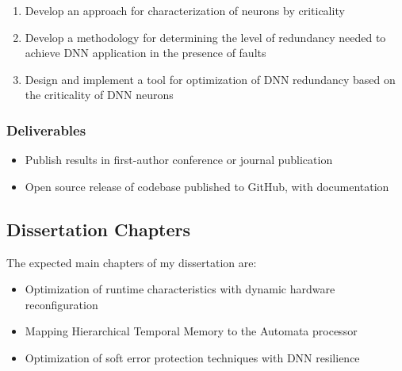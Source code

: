 \begin{enumerate}
    \item Develop an approach for characterization of neurons by criticality
    \item Develop a methodology for determining the level of redundancy needed to achieve DNN application in the presence of faults
    \item Design and implement a tool for optimization of DNN redundancy based on the criticality of DNN neurons
\end{enumerate}

\subsubsection{Deliverables}
\begin{itemize}
    \item Publish results in first-author conference or journal publication
    \item Open source release of codebase published to GitHub, with documentation
\end{itemize}

\noindent
\subsection{Dissertation Chapters}
The expected main chapters of my dissertation are:

\begin{itemize}
    \item Optimization of runtime characteristics with dynamic hardware reconfiguration
    \item Mapping Hierarchical Temporal Memory to the Automata processor
    \item Optimization of soft error protection techniques with DNN resilience
\end{itemize}
\newpage



